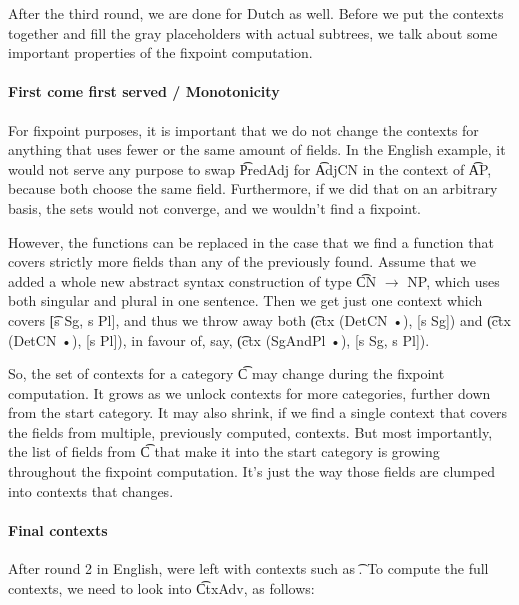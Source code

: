 After the third round, we are done for Dutch as well. Before we
put the contexts together and fill the gray placeholders with actual
subtrees, we talk about some important properties of the fixpoint
computation.

\paragraph{First come first served / Monotonicity}

For fixpoint purposes, it is important that we do not change the
contexts for anything that uses fewer or the same amount of fields.
In the English example, it would not serve any purpose to swap
\t{PredAdj} for \t{AdjCN} in the context of \t{AP}, because both
choose the same field. Furthermore, if we did that on an arbitrary
basis, the sets would not converge, and we wouldn't find a fixpoint.

However, the functions can be replaced in the case that we find a
function that covers strictly more fields than any of the previously found.
Assume that we added a whole new abstract syntax construction of type
\t{CN $\rightarrow$ NP}, which uses both singular and plural in one
sentence. Then we get just one context which covers \t{[s Sg, s Pl]},
and thus we throw away both \t{(ctx (DetCN  •), [s Sg])} and \t{(ctx (DetCN  •), [s Pl])}, in favour of, say, \t{(ctx
  (SgAndPl •), [s Sg, s Pl])}.

So, the set of contexts for a category \t{C} may change during the
fixpoint computation. It grows as we unlock contexts for more
categories, further down from the start category. It may also shrink,
if we find a single context that covers the fields from multiple,
previously computed, contexts. But most importantly, the list of
fields from \t{C} that make it into the start category is growing
throughout the fixpoint computation. It’s just the way those fields
are clumped into contexts that changes.

\paragraph{Final contexts}

After round 2 in English, were left with contexts such as \t{ \OtherTok{::=}   \NormalTok{\}}}.
To compute the full contexts, we need to look into \t{CtxAdv}, as
follows:

